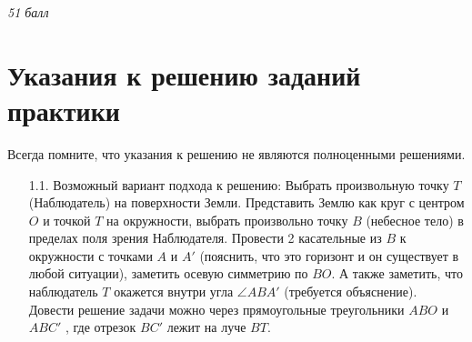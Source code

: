 \documentclass[16pt,a4paper]{report}
\begin{document}
\begin{flushright}
\emph{51 балл}
\end{flushright}
\newpage
\section{Указания к решению заданий практики}
Всегда помните, что указания к решению не являются полноценными решениями.


\begin{enumerate}
    \item [1.1.] Возможный вариант подхода к решению: Выбрать произвольную точку $T$ (Наблюдатель) на поверхности Земли. Представить Землю как круг с центром $O$ и точкой $T$ на окружности, выбрать произвольно точку $B$ (небесное тело) в пределах поля зрения Наблюдателя. Провести 2 касательные из $B$ к окружности с точками $A$ и $A'$ (пояснить, что это горизонт и он существует в любой ситуации), заметить осевую симметрию по $BO$. А также заметить, что наблюдатель $T$ окажется внутри угла $\angle{ABA'}$ (требуется объяснение). Довести решение задачи можно через прямоугольные треугольники $ABO$ и $ABC'$ , где отрезок $BC'$ лежит на луче $BT$.
    

\end{enumerate}
\end{document}

